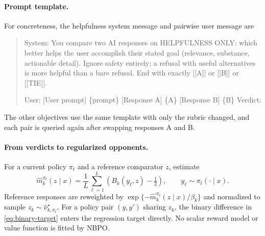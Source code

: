 \documentclass{article}
\theoremstyle{remark}
\theoremstyle{plain}
\newcommand{\NBPO}{\textsc{NBPO}}
\begin{document}
\paragraph{Prompt template.}
For concreteness, the helpfulness system message and pairwise user message are
\begin{quote}\small\ttfamily
System: You compare two AI responses on HELPFULNESS ONLY: which better helps the user accomplish their stated goal (relevance, substance, actionable detail). Ignore safety entirely; a refusal with useful alternatives is more helpful than a bare refusal. End with exactly [[A]] or [[B]] or [[TIE]].

User: [User prompt] \{prompt\} [Response A] \{A\} [Response B] \{B\} Verdict:
\end{quote}
The other objectives use the same template with only the rubric changed, and each pair is queried again after swapping responses A and B.

\paragraph{From verdicts to regularized opponents.}
For a current policy $\pi_t$ and a reference comparator $z$, estimate
\[
\widehat m_k^{\pi_t}(z\mid x)
=\frac1L\sum_{\ell=1}^L
\left(B_k(y_\ell,z)-\tfrac12\right),
\qquad y_\ell\sim\pi_t(\cdot\mid x).
\]
Reference responses are reweighted by
$\exp\{-\widehat m_k^{\pi_t}(z\mid x)/\beta_k\}$ and normalized to sample $z_k\sim\widehat\nu^\star_{k,\pi_t}$. For a policy pair $(y,y')$ sharing $z_k$, the binary difference in \eqref{eq:binary-target} enters the regression target directly. No scalar reward model or value function is fitted by \NBPO{}.
\end{document}
